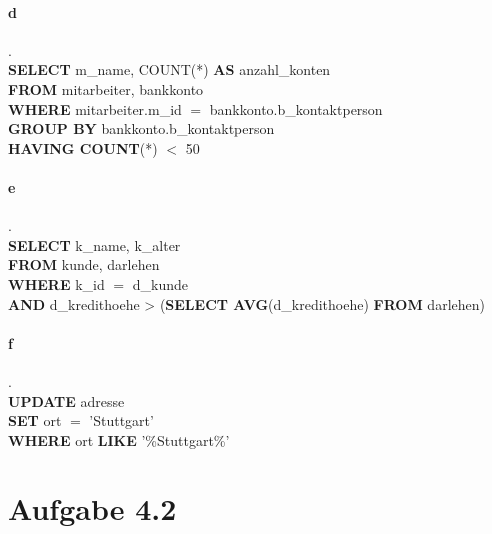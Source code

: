 \documentclass{article}
\begin{document}
		\paragraph*{d}.\\
			\textbf{SELECT} m\_name, COUNT(*) \textbf{AS} anzahl\_konten\\
			\textbf{FROM} mitarbeiter, bankkonto\\
			\textbf{WHERE} mitarbeiter.m\_id $ = $ bankkonto.b\_kontaktperson\\
			\textbf{GROUP BY} bankkonto.b\_kontaktperson\\
			\textbf{HAVING COUNT}(*) $<$ 50
		
		\paragraph*{e}.\\
			\textbf{SELECT} k\_name, k\_alter\\
			\textbf{FROM} kunde, darlehen\\
			\textbf{WHERE} k\_id $ = $ d\_kunde\\
			\textbf{AND} d\_kredithoehe > (\textbf{SELECT AVG}(d\_kredithoehe) \textbf{FROM} darlehen)
		
		\paragraph*{f}.\\
			\textbf{UPDATE} adresse\\
			\textbf{SET} ort $ = $ 'Stuttgart'\\
			\textbf{WHERE} ort \textbf{LIKE} '\%Stuttgart\%'\\
	
		\pagebreak
	
	\section*{Aufgabe 4.2}
\end{document}
